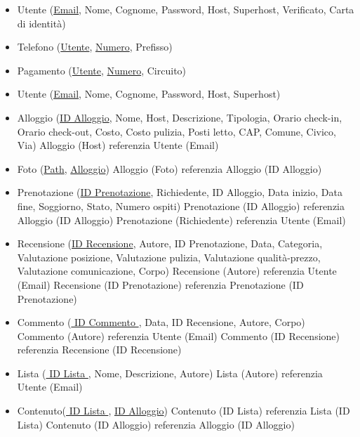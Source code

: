 \begin{itemize}
    \item Utente (\underline{Email}, Nome, Cognome, Password, Host, Superhost, Verificato, Carta di identità)
    \item Telefono (\underline{Utente}, \underline{Numero}, Prefisso)
    \item Pagamento (\underline{Utente}, \underline{Numero}, Circuito)
    \item Utente (\underline{Email}, Nome, Cognome, Password, Host, Superhost)
    \item Alloggio (\underline{ID Alloggio}, Nome, Host, Descrizione, Tipologia, Orario check-in, Orario check-out, Costo, Costo pulizia, Posti letto, CAP, Comune, Civico, Via)
          Alloggio (Host) referenzia Utente (Email)
    \item Foto (\underline{Path}, \underline{Alloggio})
          Alloggio (Foto) referenzia Alloggio (ID Alloggio)
    \item Prenotazione (\underline{ID Prenotazione}, Richiedente, ID Alloggio, Data inizio, Data fine, Soggiorno, Stato, Numero ospiti)
          Prenotazione (ID Alloggio) referenzia Alloggio (ID Alloggio)
          Prenotazione (Richiedente) referenzia Utente (Email)
    \item Recensione (\underline{ID Recensione}, Autore, ID Prenotazione, Data, Categoria, Valutazione posizione, Valutazione pulizia, Valutazione qualità-prezzo, Valutazione comunicazione, Corpo)
          Recensione (Autore) referenzia Utente (Email)
          Recensione (ID Prenotazione) referenzia Prenotazione (ID Prenotazione)
    \item Commento (\underline{ ID Commento }, Data, ID Recensione, Autore, Corpo)
          Commento (Autore) referenzia Utente (Email)
          Commento (ID Recensione) referenzia Recensione (ID Recensione)
    \item Lista (\underline{ ID Lista }, Nome, Descrizione, Autore)
          Lista (Autore) referenzia Utente (Email)
    \item Contenuto(\underline{ ID Lista }, \underline{ID Alloggio})
          Contenuto (ID Lista) referenzia Lista (ID Lista)
          Contenuto (ID Alloggio) referenzia Alloggio (ID Alloggio)
\end{itemize}